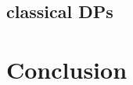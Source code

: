 \documentclass{beamer}
\begin{document}


\subsection{classical DPs}







\section{Conclusion}
\end{document}
